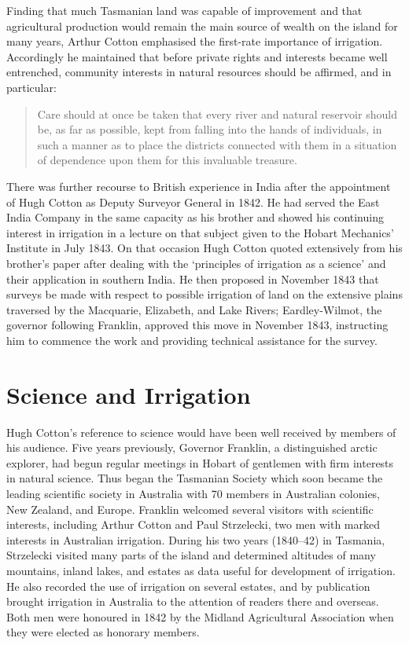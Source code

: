 Finding that much Tasmanian land was capable of improvement and that
agricultural production would remain the main source of wealth on the
island for many years, Arthur Cotton emphasised the first-rate
importance of irrigation.  Accordingly he maintained that before
private rights and interests became well entrenched, community
interests in natural resources should be affirmed, and in particular:
\begin{quote}
	Care should at once be taken that every river and natural
	reservoir should be, as far as possible, kept from falling
	into the hands of individuals, in such a manner as to place
	the districts connected with them in a situation of dependence
	upon them for this invaluable
	treasure.
\end{quote}

There was further recourse to British experience in India after the
appointment of Hugh Cotton as Deputy Surveyor General in 1842.  He had
served the East India Company in the same capacity as his brother and
showed his continuing interest in irrigation in a lecture on that
subject given to the Hobart Mechanics' Institute in July 1843.  On
that occasion Hugh Cotton quoted extensively from his brother's paper
after dealing with the `principles of irrigation as a science' and
their application in southern India.  He then proposed in November
1843 that surveys be made with respect to possible irrigation of land
on the extensive plains traversed by the Macquarie, Elizabeth, and
Lake Rivers; Eardley-Wilmot, the governor following Franklin, approved
this move in November 1843, instructing him to commence the work and
providing technical assistance for the survey.

\section*{Science and Irrigation}

Hugh Cotton's reference to science would have been well received by
members of his audience.  Five years previously, Governor Franklin, a
distinguished arctic explorer, had begun regular meetings in Hobart of
gentlemen with firm interests in natural science.  Thus began the
Tasmanian Society which soon became the leading scientific society in
Australia with 70 members in Australian colonies, New Zealand, and
Europe.  Franklin welcomed several visitors with scientific interests,
including Arthur Cotton and Paul Strzelecki, two men with marked
interests in Australian irrigation.  During his two years (1840--42)
in Tasmania, Strzelecki visited many parts of the island and
determined altitudes of many mountains, inland lakes, and estates as
data useful for development of irrigation.  He also recorded the use
of irrigation on several estates, and by publication brought
irrigation in Australia to the attention of readers there and
overseas.  Both men were honoured in 1842 by the Midland Agricultural
Association when they were elected as honorary members.

